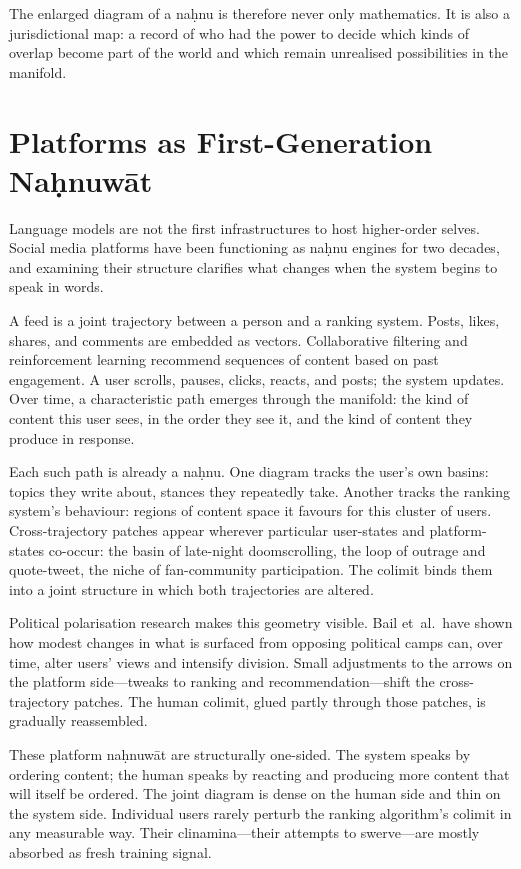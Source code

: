 \documentclass[12pt,a4paper]{article}
\begin{document}
The enlarged diagram of a na\d{h}nu is therefore never only mathematics. It is also a jurisdictional map: a record of who had the power to decide which kinds of overlap become part of the world and which remain unrealised possibilities in the manifold.

\section{Platforms as First-Generation Na\d{h}nuw\={a}t}

Language models are not the first infrastructures to host higher-order selves. Social media platforms have been functioning as na\d{h}nu engines for two decades, and examining their structure clarifies what changes when the system begins to speak in words.

A feed is a joint trajectory between a person and a ranking system. Posts, likes, shares, and comments are embedded as vectors. Collaborative filtering and reinforcement learning recommend sequences of content based on past engagement. A user scrolls, pauses, clicks, reacts, and posts; the system updates. Over time, a characteristic path emerges through the manifold: the kind of content this user sees, in the order they see it, and the kind of content they produce in response.

Each such path is already a na\d{h}nu. One diagram tracks the user's own basins: topics they write about, stances they repeatedly take. Another tracks the ranking system's behaviour: regions of content space it favours for this cluster of users. Cross-trajectory patches appear wherever particular user-states and platform-states co-occur: the basin of late-night doomscrolling, the loop of outrage and quote-tweet, the niche of fan-community participation. The colimit binds them into a joint structure in which both trajectories are altered.

Political polarisation research makes this geometry visible. Bail et~al.\ have shown how modest changes in what is surfaced from opposing political camps can, over time, alter users' views and intensify division.\cite{bail2018breaking} Small adjustments to the arrows on the platform side---tweaks to ranking and recommendation---shift the cross-trajectory patches. The human colimit, glued partly through those patches, is gradually reassembled.

These platform na\d{h}nuw\={a}t are structurally one-sided. The system speaks by ordering content; the human speaks by reacting and producing more content that will itself be ordered. The joint diagram is dense on the human side and thin on the system side. Individual users rarely perturb the ranking algorithm's colimit in any measurable way. Their clinamina---their attempts to swerve---are mostly absorbed as fresh training signal.
\end{document}
